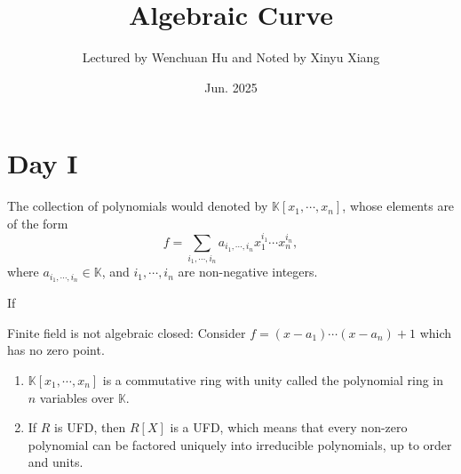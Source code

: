 \documentclass[10pt]{article}
\title{\textbf{Algebraic Curve}}
\author{Lectured by Wenchuan Hu and Noted by Xinyu Xiang}
\date{Jun. 2025}
\begin{document}
\maketitle

\section{Day I}

%

\begin{definition}[Polynomial]
  The collection of polynomials would denoted by $ \mathbb{K}[x_1,\cdots ,x_{n}]$, whose elements are of the form
  \begin{equation*}
    f = \sum_{i_1,\cdots ,i_n} a_{i_1,\cdots ,i_n} x_1^{i_1}\cdots x_n^{i_n},
  \end{equation*}
  where $ a_{i_1,\cdots ,i_n} \in \mathbb{K}$, and $ i_1,\cdots ,i_n$ are non-negative integers.
\end{definition}

\begin{definition}
  If
\end{definition}

\begin{remark}
  Finite field is not algebraic closed: Consider $ f = (x - a_{1}) \cdots (x - a_{n}) + 1$ which has no zero point.
\end{remark}

\begin{definition}

\end{definition}

\begin{proposition}
  \begin{enumerate}[(1)]
    \item   $ \mathbb{K}[x_1,\cdots ,x_{n}]$ is a commutative ring with unity called the polynomial ring in $ n$ variables over $ \mathbb{K}$.
    \item If $ R$ is UFD, then $ R[X]$ is a UFD, which means that every non-zero polynomial can be factored uniquely into irreducible polynomials, up to order and units.
  \end{enumerate}
\end{proposition}
\end{document}
